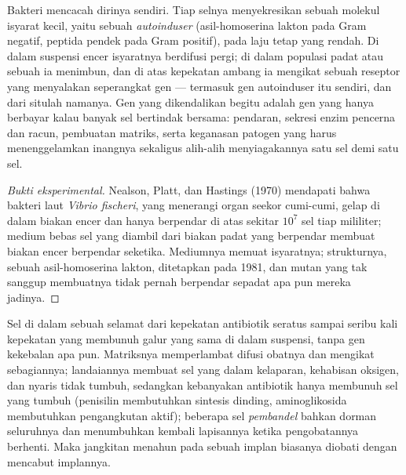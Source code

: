 \begin{proposition}\label{prop:b2:microbial-metabolism:quorum}
Bakteri mencacah dirinya sendiri. Tiap selnya menyekresikan sebuah
molekul isyarat kecil, yaitu sebuah \emph{autoinduser} (asil-homoserina
lakton pada Gram negatif, peptida pendek pada Gram positif), pada laju
tetap yang rendah. Di dalam suspensi encer isyaratnya berdifusi pergi;
di dalam populasi padat atau sebuah  ia menimbun, dan di atas
kepekatan ambang ia mengikat sebuah reseptor yang menyalakan seperangkat
gen --- termasuk gen autoinduser itu sendiri, dan dari situlah namanya.
Gen yang dikendalikan begitu adalah gen yang hanya berbayar kalau
banyak sel bertindak bersama: pendaran, sekresi enzim pencerna dan
racun, pembuatan matriks, serta keganasan patogen yang harus
menenggelamkan inangnya sekaligus alih-alih menyiagakannya satu sel
demi satu sel.
\end{proposition}
\begin{proof}[Bukti eksperimental]
Nealson, Platt, dan Hastings (1970) mendapati bahwa bakteri laut
\emph{Vibrio fischeri}, yang menerangi organ seekor cumi-cumi, gelap di
dalam biakan encer dan hanya berpendar di atas sekitar $10^{7}$ sel
tiap mililiter; medium bebas sel yang diambil dari biakan padat yang
berpendar membuat biakan encer berpendar seketika. Mediumnya memuat
isyaratnya; strukturnya, sebuah asil-homoserina lakton, ditetapkan pada
1981, dan mutan yang tak sanggup membuatnya tidak pernah berpendar
sepadat apa pun mereka jadinya.
\end{proof}

\begin{example}\label{ex:b2:microbial-metabolism:tolerance}
Sel di dalam sebuah  selamat dari kepekatan antibiotik seratus
sampai seribu kali kepekatan yang membunuh galur yang sama di dalam
suspensi, tanpa gen kekebalan apa pun. Matriksnya memperlambat difusi
obatnya dan mengikat sebagiannya; landaiannya membuat sel yang dalam
kelaparan, kehabisan oksigen, dan nyaris tidak tumbuh, sedangkan
kebanyakan antibiotik hanya membunuh sel yang tumbuh (penisilin
membutuhkan sintesis dinding, aminoglikosida membutuhkan pengangkutan
aktif); beberapa sel \emph{pembandel} bahkan dorman seluruhnya dan
menumbuhkan kembali lapisannya ketika pengobatannya berhenti. Maka
jangkitan menahun pada sebuah implan biasanya diobati dengan mencabut
implannya.
\end{example}

